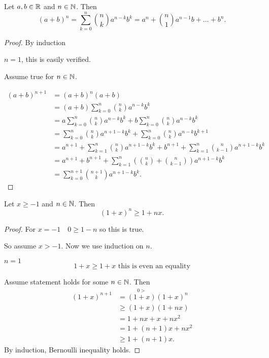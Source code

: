 \documentclass[10pt, a4paper]{article}
\begin{document}
\begin{theorem}\label{analy_thm_binom}
    Let $a, b \in \mathbb{R}$ and $n \in \mathbb{N}$. Then
    \[
    (a + b) ^ n = \sum_{k = 0}^{n}\binom{n}{k}a^{n - k}b^{k} = a ^ n + \binom{n}{1}a^{n - 1}b + \dotsc + b ^ n.
    \]
    \begin{proof}
        By induction

        $n = 1$, this is easily verified.

        Assume true for $n \in \mathbb{N}$.

        \begin{align*}
            (a + b) ^ {n + 1} &= (a + b)^n(a + b) \\
            &= (a + b)\sum_{k = 0}^{n}\binom{n}{k}a^{n - k}b^{k} \\
            &= a\sum_{k = 0}^{n}\binom{n}{k}a^{n - k}b^{k} + b\sum_{k = 0}^{n}\binom{n}{k}a^{n - k}b^{k} \\
            &= \sum_{k = 0}^{n}\binom{n}{k}a^{n + 1 - k}b^{k} + \sum_{k = 0}^{n}\binom{n}{k}a^{n - k}b^{k + 1} \\
            &= a ^ {n + 1} + \sum_{k = 1}^{n}\binom{n}{k}a^{n + 1 - k}b^{k} + b ^ {n + 1} + \sum_{k = 1}^{n}\binom{n}{k - 1}a^{n + 1 - k}b^{k} \\
            &= a ^ {n + 1} + b ^ {n + 1} + \sum_{k = 1}^{n}\left(\binom{n}{k} + \binom{n}{k - 1}\right)a^{n + 1 - k}b^{k} \\
            &= \sum_{k = 0}^{n + 1}\binom{n + 1}{k}a^{n + 1 - k}b^{k}.
        \end{align*}
    \end{proof}
\end{theorem}

\begin{theorem}\label{analy_thm_bernoineq}
    Let $x \geq -1$ and $n \in \mathbb{N}$. Then
    \[
    (1 + x) ^ n \geq 1 + nx.
    \]
    \begin{proof}
        For $x = -1\quad 0 \geq 1 - n$ so this is true.

        So assume $x > -1$. Now we use induction on $n$.

        $n = 1$
        \[
        1 + x \geq 1 + x\text{ this is even an equality}
        \]

        Assume statement holds for some $n \in \mathbb{N}$. Then
        \begin{align*}
            (1 + x) ^ {n + 1} &= \overset{0 >}{(1 + x)}(1 + x) ^ n \\
            &\geq (1 + x)(1 + nx) \\
            &= 1 + nx + x + nx ^ 2 \\
            &= 1 + (n + 1)x + nx ^ 2 \\
            &\geq 1 + (n + 1)x.
        \end{align*}
        By induction, Bernoulli inequality holds.
    \end{proof}
\end{theorem}
\end{document}

